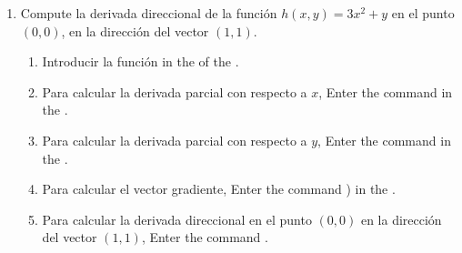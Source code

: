 \begin{enumerate}[leftmargin=*]

\item Compute la derivada direccional de la función $h(x,y)= 3x^2+y$ en el punto $(0,0)$, en la dirección del vector $(1,1)$.
      \begin{indication}
      \begin{enumerate}
      \item Introducir la función  in the  of the  .
      \item Para calcular la derivada parcial con respecto a $x$, Enter the command  in the .
      \item Para calcular la derivada parcial con respecto a $y$, Enter the command  in the .
      \item Para calcular el vector gradiente, Enter the command ) in the .
      \item Para calcular la derivada direccional en el punto $(0,0)$ en la dirección del vector $(1,1)$, Enter the command .
      \end{enumerate}
      \end{indication}


\end{enumerate}
